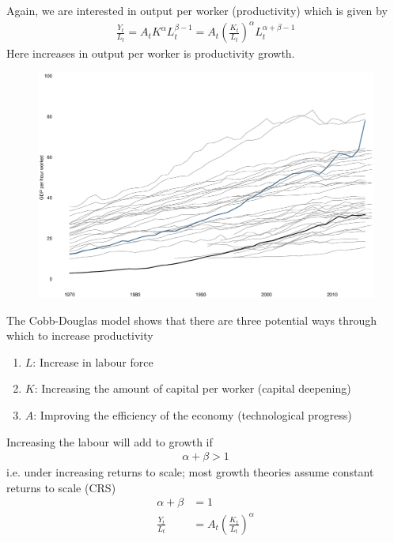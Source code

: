 \documentclass{beamer}
\begin{document}
\begin{frame}
  Again, we are interested in output per worker (productivity) which is given by
  \begin{align}
    \frac{Y_t}{L_t}=A_tK^{\alpha}L^{\beta-1}_t=A_t \left(\frac{K_t}{L_t} \right)^{\alpha}L_t^{\alpha+\beta-1}
  \end{align}
  \medskip
  Here increases in output per worker is productivity growth.
\end{frame}

\begin{frame}
  \begin{figure}
    \includegraphics[scale=.3]{productivity.eps}
  \end{figure}
\end{frame}

\begin{frame}
 The Cobb-Douglas model shows that there are three potential ways through which to increase productivity
\begin{enumerate}
  \item $L$: Increase in labour force  
  \item $K$: Increasing the amount of capital per worker (capital deepening)
  \item $A$: Improving the efficiency of the economy (technological progress)  
\end{enumerate}
\end{frame}

\begin{frame}
 Increasing the labour will add to growth if 
 \begin{align}
   \alpha+\beta>1
 \end{align}
 \medskip
 i.e. under increasing returns to scale; most growth theories assume constant returns to scale (CRS)
 \begin{align}
   \alpha+\beta &= 1\\
   \frac{Y_t}{L_t} &= A_t \left(\frac{K_t}{L_t}\right)^{\alpha}
 \end{align}
\end{frame}
\end{document}
